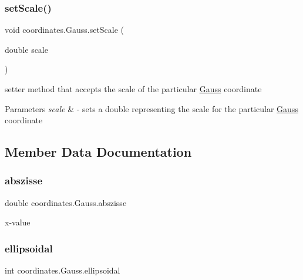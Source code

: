 \subsubsection{\texorpdfstring{set\+Scale()}{setScale()}}
{\footnotesize\ttfamily void coordinates.\+Gauss.\+set\+Scale (\begin{DoxyParamCaption}\item[{double}]{scale }\end{DoxyParamCaption})}



setter method that accepts the scale of the particular \hyperlink{classcoordinates_1_1_gauss}{Gauss} coordinate 


\begin{DoxyParams}{Parameters}
{\em scale} & -\/ sets a double representing the scale for the particular \hyperlink{classcoordinates_1_1_gauss}{Gauss} coordinate \\
\hline
\end{DoxyParams}


\subsection{Member Data Documentation}
\mbox{\label{classcoordinates_1_1_gauss_a9bd37a096f53a9e443570ec5748f95d8}} 
\subsubsection{\texorpdfstring{abszisse}{abszisse}}
{\footnotesize\ttfamily double coordinates.\+Gauss.\+abszisse\hspace{0.3cm}{\ttfamily [private]}}

x-\/value \mbox{\label{classcoordinates_1_1_gauss_a08582ecf17604f8330df079ce234008c}} 
\subsubsection{\texorpdfstring{ellipsoidal}{ellipsoidal}}
{\footnotesize\ttfamily int coordinates.\+Gauss.\+ellipsoidal\hspace{0.3cm}{\ttfamily [private]}}

